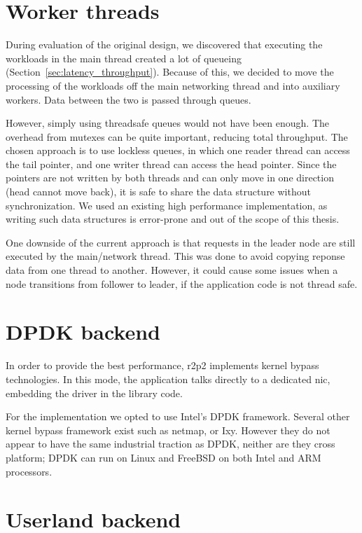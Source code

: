 \section{Worker threads}

During evaluation of the original design, we discovered that executing the workloads in the main thread created a lot of queueing (Section~\ref{sec:latency_throughput}).
Because of this, we decided to move the processing of the workloads off the main networking thread and into auxiliary workers.
Data between the two is passed through queues.

However, simply using threadsafe queues would not have been enough.
The overhead from mutexes can be quite important, reducing total throughput.
The chosen approach is to use lockless queues, in which one reader thread can access the tail pointer, and one writer thread can access the head pointer.
Since the pointers are not written by both threads and can only move in one direction (head cannot move back), it is safe to share the data structure without synchronization.
We used an existing high performance implementation\cite{fast_queue}, as writing such data structures is error-prone and out of the scope of this thesis.

One downside of the current approach is that requests in the leader node are still executed by the main/network thread.
This was done to avoid copying reponse data from one thread to another.
However, it could cause some issues when a node transitions from follower to leader, if the application code is not thread safe.

\section{DPDK backend}

In order to provide the best performance, \gls{r2p2} implements kernel bypass technologies.
In this mode, the application talks directly to a dedicated \gls{nic}, embedding the driver in the library code.

For the implementation we opted to use Intel's DPDK framework.
Several other kernel bypass framework exist such as netmap\cite{netmap}, or Ixy\cite{ixy}.
However they do not appear to have the same industrial traction as DPDK, neither are they cross platform; DPDK can run on Linux and FreeBSD on both Intel and ARM processors.

\section{Userland backend}

